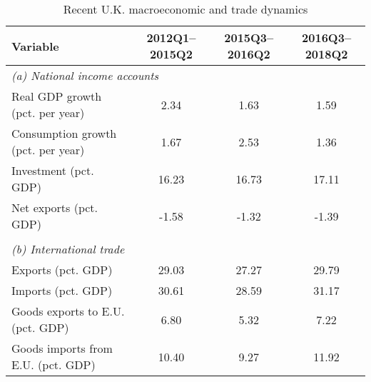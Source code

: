 \begin{table}[h!]
\renewcommand{\arraystretch}{1.2}
\begin{center}
\caption{Recent U.K. macroeconomic and trade dynamics}
\label{tab:recent-data}
\begin{tabular}{l c c c}
\toprule
Variable & 2012Q1--2015Q2 & 2015Q3--2016Q2 & 2016Q3--2018Q2\\
\midrule
\multicolumn{4}{l}{\textit{(a) National income accounts}}\\
Real GDP growth (pct. per year)&2.34&1.63&1.59\\
Consumption growth (pct. per year)&1.67&2.53&1.36\\
Investment (pct. GDP)&16.23&16.73&17.11\\
Net exports (pct. GDP)&-1.58&-1.32&-1.39\\
\\
\multicolumn{4}{l}{\textit{(b) International trade}}\\
Exports (pct. GDP)&29.03&27.27&29.79\\
Imports (pct. GDP)&30.61&28.59&31.17\\
Goods exports to E.U. (pct. GDP)&6.80&5.32&7.22\\
Goods imports from E.U. (pct. GDP)&10.40&9.27&11.92\\
\bottomrule
\end{tabular}
\end{center}
\end{table}
